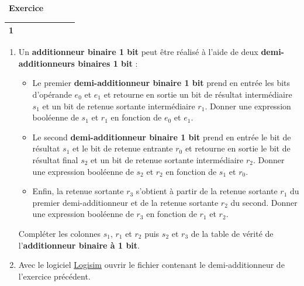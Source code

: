 \documentclass[
  11pt,
]{article}
\providecommand{\tightlist}{%
  \setlength{\itemsep}{0pt}\setlength{\parskip}{0pt}}
\newcounter{exo}
\newenvironment{exercice}[1]
{\par \medskip   \addtocounter{exo}{1} \noindent  
\begin{bclogo}[arrondi =0.1,   noborder = true, logo=\bccrayon, marge=4]{~\textbf{Exercice} \textbf{\theexo} {\itshape #1} }  \par}
{
\end{bclogo}
 \par \bigskip }
\newcounter{def}
\newcounter{logi}
\begin{document}
\begin{exercice}{}
\begin{longtable}[]{@{}clllllll@{}}
\begin{minipage}[t]{0.05\columnwidth}
1\strut
\end{minipage} & \begin{minipage}[t]{0.14\columnwidth}\raggedright
\strut
\end{minipage} & \begin{minipage}[t]{0.12\columnwidth}\raggedright
\strut
\end{minipage} & \begin{minipage}[t]{0.14\columnwidth}\raggedright
\strut
\end{minipage} & \begin{minipage}[t]{0.12\columnwidth}\raggedright
\strut
\end{minipage} & \begin{minipage}[t]{0.12\columnwidth}\raggedright
\strut
\end{minipage}\tabularnewline
\bottomrule
\end{longtable}

\begin{enumerate}
\def\labelenumi{\arabic{enumi}.}
\setcounter{enumi}{1}
\item
  Un \textbf{additionneur binaire 1 bit} peut être réalisé à l'aide de
  deux \textbf{demi-additionneurs binaires 1 bit} :

  \begin{itemize}
  \tightlist
  \item
    Le premier \textbf{demi-additionneur binaire 1 bit} prend en entrée
    les bits d'opérande \(e_{0}\) et \(e_{1}\) et retourne en sortie un
    bit de résultat intermédiaire \(s_{1}\) et un bit de retenue
    sortante intermédiaire \(r_{1}\). Donner une expression booléenne de
    \(s_{1}\) et \(r_{1}\) en fonction de \(e_{0}\) et \(e_{1}\).
  \item
    Le second \textbf{demi-additionneur binaire 1 bit} prend en entrée
    le bit de résultat \(s_{1}\) et le bit de retenue entrante \(r_{0}\)
    et retourne en sortie le bit de résultat final \(s_{2}\) et un bit
    de retenue sortante intermédiaire \(r_{2}\). Donner une expression
    booléenne de \(s_{2}\) et \(r_{2}\) en fonction de \(s_{1}\) et
    \(r_{0}\).
  \item
    Enfin, la retenue sortante \(r_{3}\) s'obtient à partir de la
    retenue sortante \(r_{1}\) du premier demi-additionneur et de la
    retenue sortante \(r_{2}\) du second. Donner une expression
    booléenne de \(r_{3}\) en fonction de \(r_{1}\) et \(r_{2}\).
  \end{itemize}

  Compléter les colonnes \(s_{1}\), \(r_{1}\) et \(r_{2}\) puis
  \(s_{2}\) et \(r_{3}\) de la table de vérité de l'\textbf{additionneur
  binaire à 1 bit}.
\item
  Avec le logiciel \href{http://www.cburch.com/logisim/}{Logisim} ouvrir
  le fichier contenant le demi-additionneur de l'exercice précédent.


\end{enumerate}
\end{exercice}
\end{document}
